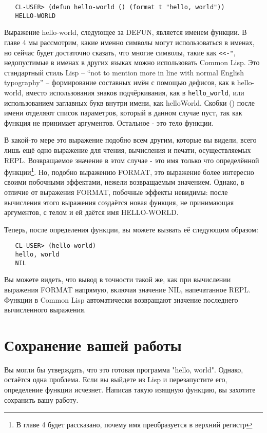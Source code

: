 \begin{verbatim}
   CL-USER> (defun hello-world () (format t "hello, world"))
   HELLO-WORLD
\end{verbatim}

Выражение hello-world, следующее за DEFUN, является именем функции. В главе 4 мы
рассмотрим, какие именно символы могут использоваться в именах, но сейчас будет достаточно
сказать, что многие символы, такие как \lstinline|<<-"|, недопустимые в именах в других
языках можно использовать Common Lisp. Это стандартный стиль Lisp -- ``not to mention more
in line with normal English typography'' -- формирование составных имён с помощью дефисов,
как в hello-world, вместо использования знаков подчёркивания, как в \lstinline|hello_world|, или
использованием заглавных букв внутри имени, как helloWorld. Скобки () после имени отделяют
список параметров, который в данном случае пуст, так как функция не принимает
аргументов. Остальное - это тело функции.

В какой-то мере это выражение подобно всем другим, которые вы видели, всего лишь ещё одно
выражение для чтения, вычисления и печати, осуществляемых REPL. Возвращаемое значение в
этом случае - это имя только что определённой функции\footnote{В главе 4 будет рассказано,
  почему имя преобразуется в верхний регистр}. Но, подобно выражению FORMAT, это выражение
более интересно своими побочными эффектами, нежели возвращаемым значением. Однако, в
отличие от выражения FORMAT, побочные эффекты невидимы: после вычисления этого выражения
создаётся новая функция, не принимающая аргументов, с телом  и ей даётся имя HELLO-WORLD.

Теперь, после определения функции, вы можете вызвать её следующим образом:

\begin{verbatim}
   CL-USER> (hello-world)
   hello, world
   NIL
\end{verbatim}

Вы можете видеть, что вывод в точности такой же, как при вычислении выражения FORMAT
напрямую, включая значение NIL, напечатанное REPL. Функции в Common Lisp автоматически
возвращают значение последнего вычисленного выражения.

\section{Сохранение вашей работы}

Вы могли бы утверждать, что это готовая программа "hello, world". Однако, остаётся одна
проблема. Если вы выйдете из Lisp и перезапустите его, определение функции
исчезнет. Написав такую изящную функцию, вы захотите сохранить вашу работу.

